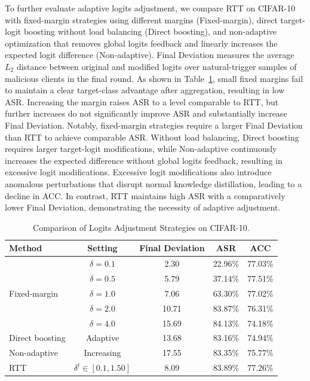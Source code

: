 \documentclass[lettersize,journal]{IEEEtran}
\newif\ifhighlight
\newcommand{\hlthree}[1]{%
    \ifhighlight{\color{reviewer3}#1}\else#1\fi
}
\begin{document}
\hlthree{
To further evaluate adaptive logits adjustment, we compare RTT on CIFAR-10 with fixed-margin strategies using different margins (Fixed-margin), direct target-logit boosting without load balancing (Direct boosting), and non-adaptive optimization that removes global logits feedback and linearly increases the expected logit difference (Non-adaptive). 
Final Deviation measures the average $L_2$ distance between original and modified logits over natural-trigger samples of malicious clients in the final round.
As shown in Table~\ref{logits_adjustment_comparison}, small fixed margins fail to maintain a clear target-class advantage after aggregation, resulting in low ASR. 
Increasing the margin raises ASR to a level comparable to RTT, but further increases do not significantly improve ASR and substantially increase Final Deviation. 
Notably, fixed-margin strategies require a larger Final Deviation than RTT to achieve comparable ASR.
Without load balancing, Direct boosting requires larger target-logit modifications, while Non-adaptive continuously increases the expected difference without global logits feedback, resulting in excessive logit modifications.
Excessive logit modifications also introduce anomalous perturbations that disrupt normal knowledge distillation, leading to a decline in ACC.
In contrast, RTT maintains high ASR with a comparatively lower Final Deviation, demonstrating the necessity of adaptive adjustment.}

\begin{table}[t]
\centering
\hlthree{
\caption{Comparison of Logits Adjustment Strategies on CIFAR-10.}
\label{logits_adjustment_comparison}
\setlength{\tabcolsep}{3pt}
\renewcommand\arraystretch{1.5}
\begin{tabular}{lcccc}
\toprule
Method & Setting & Final Deviation & ASR & ACC \\
\midrule
\multirow{5}{*}{Fixed-margin}
& $\delta=0.1$ & 2.30 & 22.96\% & 77.03\% \\
& $\delta=0.5$ & 5.79 & 37.14\% & 77.51\% \\
& $\delta=1.0$ & 7.06 & 63.30\% & 77.02\% \\
& $\delta=2.0$ & 10.71 & 83.87\% & 76.31\% \\
& $\delta=4.0$ & 15.69 & 84.13\% & 74.18\% \\
\midrule
Direct boosting & Adaptive & 13.68 & 83.16\% & 74.94\% \\
Non-adaptive & Increasing & 17.55 & 83.35\% & 75.77\% \\
\midrule
RTT & $\delta^t\in[0.1,1.50]$ & 8.09 & 83.89\% & 77.26\% \\
\bottomrule
\end{tabular}
}
\end{table}
\end{document}
